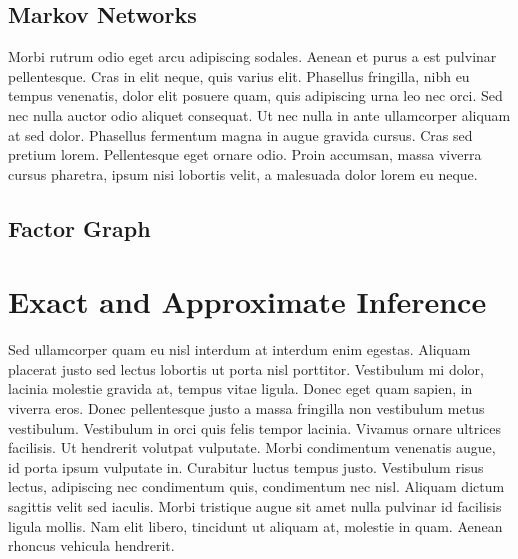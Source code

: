 
\subsection{Markov Networks}
Morbi rutrum odio eget arcu adipiscing sodales. Aenean et purus a est pulvinar pellentesque. Cras in elit neque, quis varius elit. Phasellus fringilla, nibh eu tempus venenatis, dolor elit posuere quam, quis adipiscing urna leo nec orci. Sed nec nulla auctor odio aliquet consequat. Ut nec nulla in ante ullamcorper aliquam at sed dolor. Phasellus fermentum magna in augue gravida cursus. Cras sed pretium lorem. Pellentesque eget ornare odio. Proin accumsan, massa viverra cursus pharetra, ipsum nisi lobortis velit, a malesuada dolor lorem eu neque.


\subsection{Factor Graph}






\section{Exact and Approximate Inference}

Sed ullamcorper quam eu nisl interdum at interdum enim egestas. Aliquam placerat justo sed lectus lobortis ut porta nisl porttitor. Vestibulum mi dolor, lacinia molestie gravida at, tempus vitae ligula. Donec eget quam sapien, in viverra eros. Donec pellentesque justo a massa fringilla non vestibulum metus vestibulum. Vestibulum in orci quis felis tempor lacinia. Vivamus ornare ultrices facilisis. Ut hendrerit volutpat vulputate. Morbi condimentum venenatis augue, id porta ipsum vulputate in. Curabitur luctus tempus justo. Vestibulum risus lectus, adipiscing nec condimentum quis, condimentum nec nisl. Aliquam dictum sagittis velit sed iaculis. Morbi tristique augue sit amet nulla pulvinar id facilisis ligula mollis. Nam elit libero, tincidunt ut aliquam at, molestie in quam. Aenean rhoncus vehicula hendrerit.



